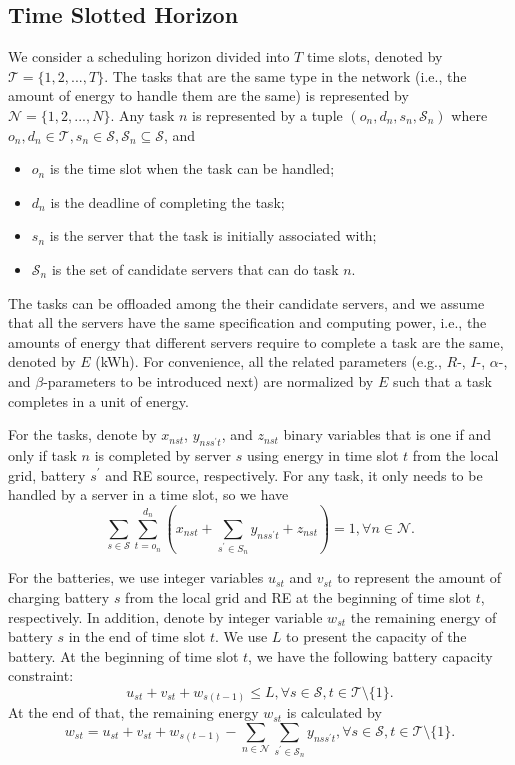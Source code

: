 \documentclass[conference, 10pt, ﬁnal, letterpaper, twocolumn]{IEEEtran}
\begin{document}
\subsection{Time Slotted Horizon}
We consider a scheduling horizon divided into $T$ time slots, denoted by $\mathcal{T} = \{1,2,...,T\}$. The tasks that are the same type in the network (i.e., the amount of energy to handle them are the same) is represented by $\mathcal{N} = \{1, 2, ..., N\}$. Any task $n$ is represented by a tuple $(o_n, d_n, s_n, \mathcal{S}_n)$ where $o_n, d_n \in \mathcal{T}, s_n \in \mathcal{S}, \mathcal{S}_n \subseteq \mathcal{S}$, and
\begin{itemize}
    \item $o_n$ is the time slot when the task can be handled;
    \item $d_n$ is the deadline of completing the task;
    \item $s_n$ is the server that the task is initially associated with;
    \item $\mathcal{S}_n$ is the set of candidate servers that can do task $n$.
\end{itemize}
The tasks can be offloaded among the their candidate servers, and we assume that all the servers have the same specification and computing power, i.e., the amounts of energy that different servers require to complete a task are the same, denoted by $E$ (kWh). For convenience, all the related parameters (e.g., $R$-, $I$-, $\alpha$-, and $\beta$-parameters to be introduced next) are normalized by $E$ such that a task completes in a unit of energy.

For the tasks, denote by $x_{nst}$, $y_{nss^\prime t}$, and $z_{nst}$ binary variables that is one if and only if task $n$ is completed by server $s$ using energy in time slot $t$ from the local grid, battery $s^\prime$ and RE source, respectively. For any task, it only needs to be handled by a server in a time slot, so we have
\begin{equation}\label{c1}
    \sum_{s \in \mathcal{S}} \sum^{d_n}_{t = o_n} ( x_{nst} + \sum_{s^\prime \in S_n}  y _{nss^\prime t} + z_{nst}) = 1, \forall n \in \mathcal{N}.
\end{equation}

For the batteries, we use integer variables $u_{st}$ and $v_{st}$ to represent the amount of charging battery $s$ from the local grid and RE at the beginning of time slot $t$, respectively. In addition, denote by integer variable $w_{st}$ the remaining energy of battery $s$ in the end of time slot $t$. We use $L$ to present the capacity of the battery. At the beginning of time slot $t$, we have the following battery capacity constraint:
\begin{equation}\label{c2}
    u_{st} + v_{st} + w_{s(t-1)} \leq L, \forall s \in \mathcal{S}, t \in \mathcal{T} \setminus \{1\}.
\end{equation}
At the end of that, the remaining energy $w_{st}$ is calculated by
\begin{equation}\label{c3}
    w_{st} = u_{st} + v_{st} + w_{s(t-1)} - \sum_{n\in\mathcal{N}} \sum_{s^\prime \in \mathcal{S}_n} y_{nss^\prime t}, \forall s \in \mathcal{S}, t \in \mathcal{T} \setminus \{1\}.
\end{equation}
\end{document}
